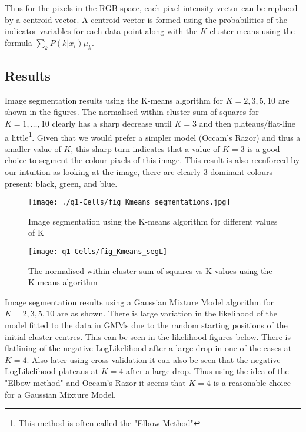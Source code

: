 \documentclass{article}
\begin{document}
Thus for the pixels in the RGB space, each pixel intensity vector can be replaced by a centroid vector. A centroid vector is formed using the probabilities of the indicator variables for each data point along with the $K$ cluster means using the formula $\sum_k P(k | x_i ) \mu_k$. 


\subsection{Results}

Image segmentation results using the K-means algorithm for $K=2,3,5,10$ are shown in the figures. The normalised within cluster sum of squares for $K = 1 ,\dots ,10$ clearly has a sharp decrease until $K=3$ and then plateaus/flat-line a little\footnote{This method is often called the "Elbow Method"}. Given that we would prefer a simpler model (Occam's Razor) and thus a smaller value of $K$, this sharp turn indicates that a value of $K = 3$ is a good choice to segment the colour pixels of this image. This result is also reenforced by our intuition as looking at the image, there are clearly 3 dominant colours present: black, green, and blue.

\begin{figure}[h!]
	\centering
	\texttt{[image: ./q1-Cells/fig\_Kmeans\_segmentations.jpg]}
	\caption{Image segmentation using the K-means algorithm for different values of K}
\end{figure}

\begin{figure}[h!]
	\centering
	\texttt{[image: q1-Cells/fig\_Kmeans\_segL]}
	\caption{The normalised within cluster sum of squares vs K values using the K-means algorithm}
\end{figure}

Image segmentation results using a Gaussian Mixture Model algorithm for $K=2,3,5,10$ are as shown. There is large variation in the likelihood of the model fitted to the data in GMMs due to the random starting positions of the initial cluster centres. This can be seen in the likelihood figures below. There is flatlining of the negative LogLikelihood after a large drop in one of the cases at $K=4$. Also later using cross validation it can also be seen that the negative LogLikelihood plateaus at $K=4$ after a large drop. Thus using the idea of the "Elbow method" and Occam's Razor it seems that $K=4$ is a reasonable choice for a Gaussian Mixture Model. 
\end{document}
